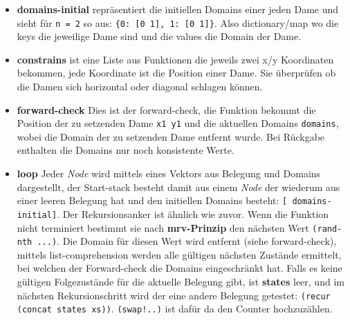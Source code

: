 \documentclass[a4paper,10pt]{article}
\begin{document}
\begin{itemize}
  \item \textbf{domains-initial} repräsentiert die initiellen Domains einer jeden Dame und sieht für \texttt{n = 2} so aus: \texttt{\{0: [0 1], 1: [0 1]\}}. Also dictionary/map wo die keys die jeweilige Dame sind und die values die Domain der Dame.
    \item \textbf{constrains} ist eine Liste aus Funktionen die jeweils zwei x/y Koordinaten bekommen, jede Koordinate ist die Position einer Dame. Sie überprüfen ob die Damen sich horizontal oder diagonal schlagen können.
    \item \textbf{forward-check} Dies ist der forward-check, die Funktion bekommt die Position der zu setzenden Dame \texttt{x1 y1} und die aktuellen Domains \texttt{domains}, wobei die Domain der zu setzenden Dame entfernt wurde. Bei Rückgabe enthalten die Domains nur noch konsistente Werte.
    \item \textbf{loop} Jeder \textit{Node} wird mittels eines Vektors aus Belegung und Domains dargestellt, der Start-stack besteht damit aus einem \textit{Node} der wiederum aus einer leeren Belegung hat und den initiellen Domains besteht: \texttt{[{} domains-initial]}. Der Rekursionsanker ist ähnlich wie zuvor. Wenn die Funktion nicht terminiert bestimmt sie nach \textbf{mrv-Prinzip} den nächsten Wert \texttt{(rand-nth ...)}. Die Domain für diesen Wert wird entfernt (siehe forward-check), mittels list-comprehension werden alle gültigen nächsten Zustände ermittelt, bei welchen der Forward-check die Domains eingeschränkt hat. Falls es keine gültigen Folgezustände für die aktuelle Belegung gibt, ist \textbf{states} leer, und im nächsten Rekursionschritt wird der eine andere Belegung getestet: \texttt{(recur (concat states xs))}. \texttt{(swap!..)} ist dafür da den Counter hochzuzählen.
\end{itemize}
\newpage
\end{document}
